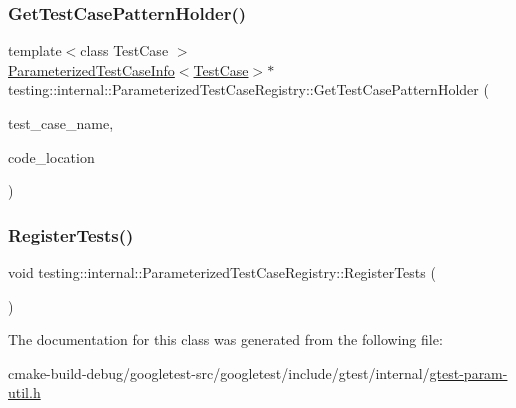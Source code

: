 \subsubsection{\texorpdfstring{GetTestCasePatternHolder()}{GetTestCasePatternHolder()}}
{\footnotesize\ttfamily template$<$class Test\+Case $>$ \\
\mbox{\hyperlink{classtesting_1_1internal_1_1ParameterizedTestCaseInfo}{Parameterized\+Test\+Case\+Info}}$<$\mbox{\hyperlink{classtesting_1_1TestCase}{Test\+Case}}$>$$\ast$ testing\+::internal\+::\+Parameterized\+Test\+Case\+Registry\+::\+Get\+Test\+Case\+Pattern\+Holder (\begin{DoxyParamCaption}\item[{const char $\ast$}]{test\+\_\+case\+\_\+name,  }\item[{\mbox{\hyperlink{structtesting_1_1internal_1_1CodeLocation}{Code\+Location}}}]{code\+\_\+location }\end{DoxyParamCaption})\hspace{0.3cm}{\ttfamily [inline]}}

\mbox{\label{classtesting_1_1internal_1_1ParameterizedTestCaseRegistry_ad5b63c8fe94f3d51d039a76c001c9223}} 
\subsubsection{\texorpdfstring{RegisterTests()}{RegisterTests()}}
{\footnotesize\ttfamily void testing\+::internal\+::\+Parameterized\+Test\+Case\+Registry\+::\+Register\+Tests (\begin{DoxyParamCaption}{ }\end{DoxyParamCaption})\hspace{0.3cm}{\ttfamily [inline]}}



The documentation for this class was generated from the following file\+:\begin{DoxyCompactItemize}
\item 
cmake-\/build-\/debug/googletest-\/src/googletest/include/gtest/internal/\mbox{\hyperlink{gtest-param-util_8h}{gtest-\/param-\/util.\+h}}\end{DoxyCompactItemize}
